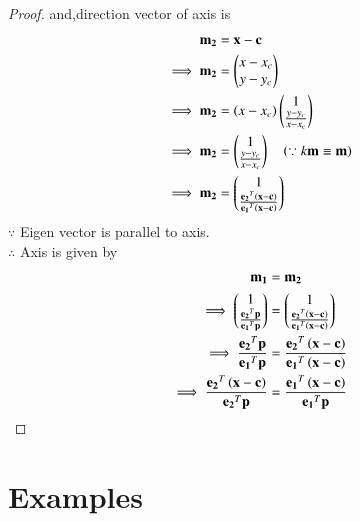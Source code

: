 \documentclass[journal,12pt,twocolumn]{IEEEtran}
\begin{document}
\begin{proof}
and,direction vector of axis is
\begin{align}
    \mathbf{m_2} &= \mathbf{x}-\mathbf{c}
    \\
    \implies \mathbf{m_2} &= \begin{pmatrix}x-x_c \\ y-y_c\end{pmatrix} \\
    \implies \mathbf{m_2} &= \left(x-x_c\right)\begin{pmatrix}1 \\ \frac{y-y_c}{x-x_c}\end{pmatrix} \\
    \implies \mathbf{m_2} &= \begin{pmatrix}1 \\ \frac{y-y_c}{x-x_c}\end{pmatrix}  \quad \left(\because k\mathbf{m} \equiv \mathbf{m}\right) \\
    \implies \mathbf{m_2} &= \begin{pmatrix}1 \\ \frac{\mathbf{e_2}^T\left(\mathbf{x}-\mathbf{c}\right)}{\mathbf{e_1}^T\left(\mathbf{x}-\mathbf{c}\right)}\end{pmatrix}
\end{align}
$\because$ Eigen vector is parallel to axis. \\
$\therefore$ Axis is given by
\begin{align}
    \mathbf{m_1} &= \mathbf{m_2} \\
    \implies \begin{pmatrix}1 \\ \frac{\mathbf{e_2}^T\mathbf{p}}{\mathbf{e_1}^T\mathbf{p}}\end{pmatrix} &= \begin{pmatrix}1 \\ \frac{\mathbf{e_2}^T\left(\mathbf{x}-\mathbf{c}\right)}{\mathbf{e_1}^T\left(\mathbf{x}-\mathbf{c}\right)}\end{pmatrix} \\ 
    \implies \frac{\mathbf{e_2}^T\mathbf{p}}{\mathbf{e_1}^T\mathbf{p}} &= \frac{\mathbf{e_2}^T\left(\mathbf{x}-\mathbf{c}\right)}{\mathbf{e_1}^T\left(\mathbf{x}-\mathbf{c}\right)} \\
    \implies \frac{\mathbf{e_2}^T\left(\mathbf{x}-\mathbf{c}\right)}{{\mathbf{e_2}^T\mathbf{p}}} &= \frac{\mathbf{e_1}^T\left(\mathbf{x}-\mathbf{c}\right)}{{\mathbf{e_1}^T\mathbf{p}}}
\end{align}

\end{proof}

\section{Examples}
\end{document}
